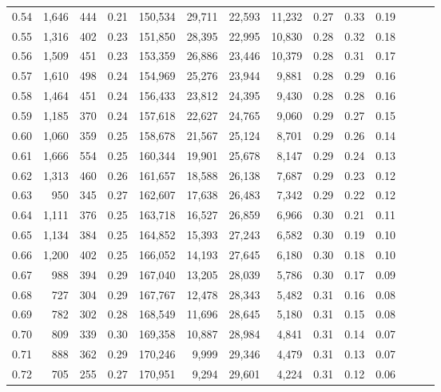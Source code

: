 \begin{tabular}{rrrrrrrrrrrrrr}
0.54 &  1,646 &  444 &  0.21 &  150,534 &   29,711 &  22,593 &  11,232 &  0.27 &  0.33 &      0.19 \\
0.55 &  1,316 &  402 &  0.23 &  151,850 &   28,395 &  22,995 &  10,830 &  0.28 &  0.32 &      0.18 \\
0.56 &  1,509 &  451 &  0.23 &  153,359 &   26,886 &  23,446 &  10,379 &  0.28 &  0.31 &      0.17 \\
0.57 &  1,610 &  498 &  0.24 &  154,969 &   25,276 &  23,944 &   9,881 &  0.28 &  0.29 &      0.16 \\
0.58 &  1,464 &  451 &  0.24 &  156,433 &   23,812 &  24,395 &   9,430 &  0.28 &  0.28 &      0.16 \\
0.59 &  1,185 &  370 &  0.24 &  157,618 &   22,627 &  24,765 &   9,060 &  0.29 &  0.27 &      0.15 \\
0.60 &  1,060 &  359 &  0.25 &  158,678 &   21,567 &  25,124 &   8,701 &  0.29 &  0.26 &      0.14 \\
0.61 &  1,666 &  554 &  0.25 &  160,344 &   19,901 &  25,678 &   8,147 &  0.29 &  0.24 &      0.13 \\
0.62 &  1,313 &  460 &  0.26 &  161,657 &   18,588 &  26,138 &   7,687 &  0.29 &  0.23 &      0.12 \\
0.63 &    950 &  345 &  0.27 &  162,607 &   17,638 &  26,483 &   7,342 &  0.29 &  0.22 &      0.12 \\
0.64 &  1,111 &  376 &  0.25 &  163,718 &   16,527 &  26,859 &   6,966 &  0.30 &  0.21 &      0.11 \\
0.65 &  1,134 &  384 &  0.25 &  164,852 &   15,393 &  27,243 &   6,582 &  0.30 &  0.19 &      0.10 \\
0.66 &  1,200 &  402 &  0.25 &  166,052 &   14,193 &  27,645 &   6,180 &  0.30 &  0.18 &      0.10 \\
0.67 &    988 &  394 &  0.29 &  167,040 &   13,205 &  28,039 &   5,786 &  0.30 &  0.17 &      0.09 \\
0.68 &    727 &  304 &  0.29 &  167,767 &   12,478 &  28,343 &   5,482 &  0.31 &  0.16 &      0.08 \\
0.69 &    782 &  302 &  0.28 &  168,549 &   11,696 &  28,645 &   5,180 &  0.31 &  0.15 &      0.08 \\
0.70 &    809 &  339 &  0.30 &  169,358 &   10,887 &  28,984 &   4,841 &  0.31 &  0.14 &      0.07 \\
0.71 &    888 &  362 &  0.29 &  170,246 &    9,999 &  29,346 &   4,479 &  0.31 &  0.13 &      0.07 \\
0.72 &    705 &  255 &  0.27 &  170,951 &    9,294 &  29,601 &   4,224 &  0.31 &  0.12 &      0.06 \\

\end{tabular}

